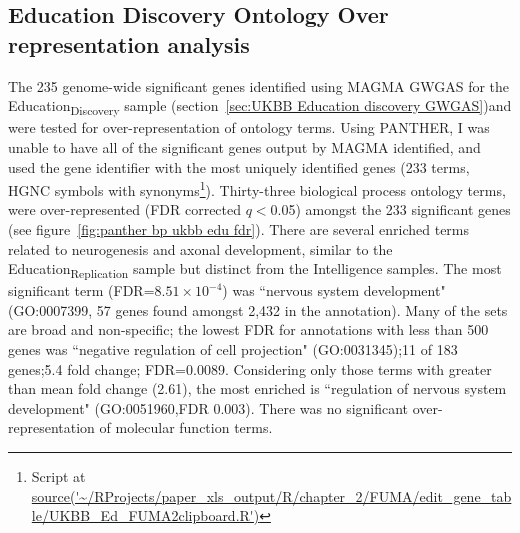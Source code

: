 \subsection{Education Discovery Ontology Over representation analysis}
      The 235 genome-wide significant genes identified using MAGMA GWGAS for the Education\textsubscript{Discovery} sample (section~\ref{sec:UKBB Education discovery GWGAS})and  were tested for over-representation of ontology terms. 
      Using PANTHER, I was unable to have all of the significant genes output by MAGMA identified, and used the gene identifier with the most uniquely identified genes  (233 terms, HGNC symbols with synonyms\footnote{ Script at \url{source('~/RProjects/paper_xls_output/R/chapter_2/FUMA/edit_gene_table/UKBB_Ed_FUMA2clipboard.R')}}).
    Thirty-three biological process ontology terms, were over-represented (FDR corrected $q<$0.05) amongst the 233 significant genes (see figure~\ref{fig:panther bp ukbb edu fdr}). There are several enriched terms related to neurogenesis and axonal development, similar to the Education\textsubscript{Replication} sample but distinct from the Intelligence samples. The most significant term (FDR=$8.51\times10^{-4}$) was ``nervous system development" (GO:0007399, 57 genes found amongst 2,432 in the annotation). Many of the sets are broad and non-specific; the lowest FDR for annotations with less than 500 genes was ``negative regulation of cell projection" (GO:0031345);11 of 183 genes;5.4 fold change; FDR=0.0089.  Considering only those terms with greater than mean fold change (2.61), the most enriched is ``regulation of nervous system development" (GO:0051960,FDR 0.003). There was no significant over-representation of molecular function terms. 
    
